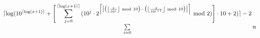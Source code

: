 \documentclass[landscape, 12pt]{report}
\newcommand{\Mod}[1]{\ \text{mod}\ #1}
\begin{document}
\everymath{\displaystyle}
\DeclarePairedDelimiter\ceil{\lceil}{\rceil}
\DeclarePairedDelimiter\floor{\lfloor}{\rfloor}
\DeclarePairedDelimiter\abs{\mathopen|}{\mathclose|}%

\makeatletter
\let\oldabs\abs
\def\abs{\@ifstar{\oldabs}{\oldabs*}}
%


$
	\sum\limits_{i=0}^{
		\displaystyle \ceil{\log({							%
			{{10}^{ \ceil*{\log(x + 1)}} + 
			{
				\Bigg[ \sum_{j=0}^{\ceil* {\log(x + 1)}}{ 	%
					{
						( 10 ^ {j} \cdot 2 ^ {\ceil*{\big\vert{\big(\floor*{\frac{x}{10^j}} \Mod 10\big) - \big(\floor*{\frac{x}{10^{j+1}}} \Mod 10\big)}\big\vert}} { \Mod {2} } )	%
					} \Bigg] \cdot {10}
				}
			}
		}
	} + 2)} - 2}
	{
		n %
	}
$
\end{document}

